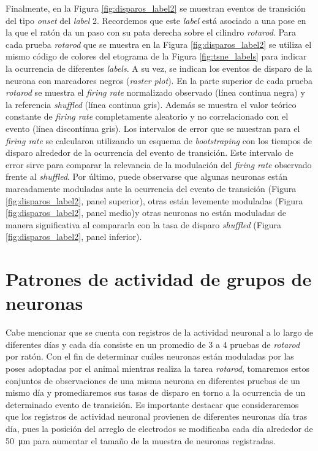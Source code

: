 Finalmente, en la Figura \ref{fig:disparos_label2} se muestran eventos de transición del tipo \textit{onset} del \textit{label} 2. Recordemos que este \textit{label} está asociado a una pose en la que el ratón da un paso con su pata derecha sobre el cilindro \textit{rotarod}. Para cada prueba \textit{rotarod} que se muestra en la Figura \ref{fig:disparos_label2} se utiliza el mismo código de colores del etograma de la Figura \ref{fig:tsne_labels} para indicar la ocurrencia de diferentes \textit{labels}. A su vez, se indican los eventos de disparo de la neurona con marcadores negros (\textit{raster plot}). En la parte superior de cada prueba \textit{rotarod} se muestra el \textit{firing rate} normalizado observado (línea continua negra) y la referencia \textit{shuffled} (línea continua gris). Además se muestra el valor teórico constante de \textit{firing rate} completamente aleatorio y no correlacionado con el evento (línea discontinua gris). Los intervalos de error que se muestran para el \textit{firing rate} se calcularon utilizando un esquema de \textit{bootstraping} con los tiempos de disparo alrededor de la ocurrencia del evento de transición. Este intervalo de error sirve para comparar la relevancia de la modulación del \textit{firing rate} observado frente al \textit{shuffled}.
Por último, puede observarse que algunas neuronas están marcadamente moduladas ante la ocurrencia del evento de transición (Figura \ref{fig:disparos_label2}, panel superior), otras están levemente moduladas (Figura \ref{fig:disparos_label2}, panel medio)y otras neuronas no están moduladas de manera significativa al compararla con la tasa de disparo \textit{shuffled} (Figura \ref{fig:disparos_label2}, panel inferior).

\section{Patrones de actividad de grupos de neuronas}\label{sec:poblacion}

Cabe mencionar que se cuenta con registros de la actividad neuronal a lo largo de diferentes días y cada día consiste en un promedio de 3 a 4  pruebas de \textit{rotarod} por ratón. Con el fin de determinar cuáles neuronas están moduladas por las poses adoptadas por el animal mientras realiza la tarea \textit{rotarod}, tomaremos estos conjuntos de observaciones de una misma neurona en diferentes pruebas de un mismo día y promediaremos sus tasas de disparo en torno a la ocurrencia de un determinado evento de transición. Es importante destacar que consideraremos que los registros de actividad neuronal provienen de diferentes neuronas día tras día, pues la posición del arreglo de electrodos se modificaba cada día alrededor de \SI{50}{\micro\metre} para aumentar el tamaño de la muestra de neuronas registradas. 

